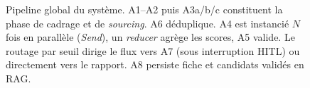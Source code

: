 \begin{figure}[H]
\caption[Pipeline global des huit agents]{Pipeline global du système. A1--A2 puis A3a/b/c constituent la phase de cadrage et de \emph{sourcing}. A6 déduplique. A4 est instancié $N$ fois en parallèle (\emph{Send}), un \emph{reducer} agrège les scores, A5 valide. Le routage par seuil dirige le flux vers A7 (sous interruption HITL) ou directement vers le rapport. A8 persiste fiche et candidats validés en RAG.}
\label{fig:pipeline_global}
\end{figure}
